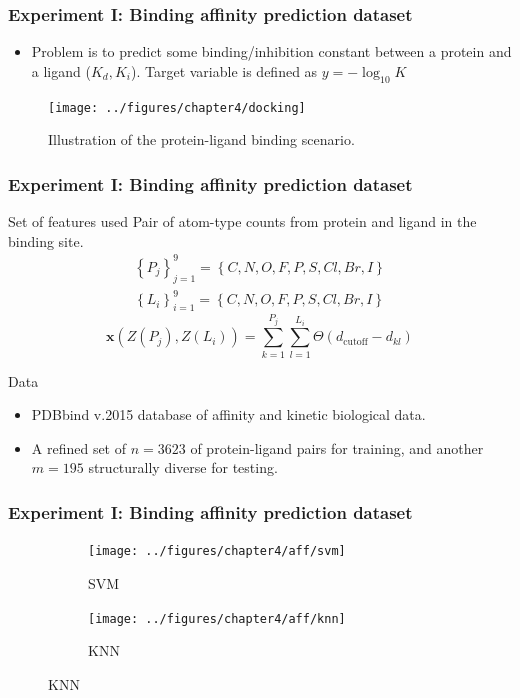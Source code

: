 \documentclass[10pt,usenames,dvipsnames]{beamer}
\begin{document}
\begin{frame}
	\frametitle{Experiment I: Binding affinity prediction dataset}

\begin{itemize}
\item Problem is to predict some binding/inhibition constant between a protein and a ligand ($K_d, K_i$). Target variable is defined as $y = -\log_{10}K$
\end{itemize}			

\begin{figure}
\texttt{[image: ../figures/chapter4/docking]}
\caption{Illustration of the protein-ligand binding scenario.}	
\end{figure}
\end{frame}

\begin{frame}
\frametitle{Experiment I: Binding affinity prediction dataset}
\begin{block}{Set of features used}
Pair of atom-type counts from protein and ligand in the binding site.
\begin{align*}
\left\lbrace P_j \right\rbrace_{j=1}^9 = \left\lbrace C, N, O, F, P, S, Cl, Br, I \right\rbrace \\
\left\lbrace L_i \right\rbrace_{i=1}^9 = \left\lbrace C, N, O, F, P, S, Cl, Br, I \right\rbrace
\end{align*}
\begin{equation}
\boldsymbol{x}\left(Z(P_j), Z(L_i)\right) = \sum_{k=1}^{P_j}\sum_{l=1}^{L_i}\Theta (d_{\mathrm{cutoff}} - d_{kl})
\end{equation}
\end{block}

\begin{block}{Data}
\begin{itemize}
\item PDBbind v.2015 database of affinity and kinetic biological data.
\item  A refined set of $n=3623$ of protein-ligand pairs for training, and another $m=195$ structurally diverse for testing.
\end{itemize}
\end{block}
\end{frame}

\begin{frame}
\frametitle{Experiment I: Binding affinity prediction dataset}
\begin{figure}[ht]
  \centering
  \caption{Benchmarking results for the binding affinity dataset (1/2).}
  \begin{subfigure}[t]{0.5\textwidth}
  	\caption{SVM}
    \centering\texttt{[image: ../figures/chapter4/aff/svm]}
  \end{subfigure}%
  \begin{subfigure}[t]{0.5\textwidth}
    \caption{KNN}
    \centering\texttt{[image: ../figures/chapter4/aff/knn]}
  \end{subfigure}
  \label{fig:aff}
\end{figure}

\end{frame}
\end{document}
